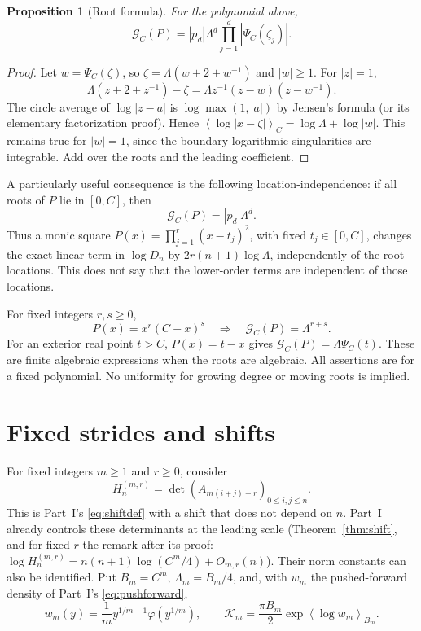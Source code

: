 \documentclass[11pt,a4paper]{article}
\numberwithin{equation}{section}
\newtheorem{proposition}[theorem]{Proposition}
\theoremstyle{remark}\newtheorem{remark}[theorem]{Remark}
\newcommand{\Lam}{\Lambda}
\newcommand{\mean}[1]{\left\langle#1\right\rangle}
\begin{document}
\begin{proposition}[Root formula]\label{szego:prop:rootformula}
For the polynomial above,
\begin{equation}\label{szego:eq:rootformula}
 \mathcal G_C(P)=|p_d|\Lam^d\prod_{j=1}^d|\Psi_C(\zeta_j)|.
\end{equation}
\end{proposition}
\begin{proof}
Let $w=\Psi_C(\zeta)$, so $\zeta=\Lam(w+2+w^{-1})$ and $|w|\geq1$.
For $|z|=1$,
\[
 \Lam(z+2+z^{-1})-\zeta=\Lam z^{-1}(z-w)(z-w^{-1}).
\]
The circle average of $\log|z-a|$ is $\log\max(1,|a|)$ by Jensen's formula
(or its elementary factorization proof). Hence
$\mean{\log|x-\zeta|}_C=\log\Lam+\log|w|$.
This remains true for $|w|=1$, since the boundary logarithmic singularities
are integrable. Add over the roots and the leading coefficient.
\end{proof}

A particularly useful consequence is the following location-independence:
if all roots of $P$ lie in $[0,C]$, then
\begin{equation}\label{szego:eq:invisible}
 \mathcal G_C(P)=|p_d|\Lam^d.
\end{equation}
Thus a monic square $P(x)=\prod_{j=1}^r(x-t_j)^2$, with fixed
$t_j\in[0,C]$, changes the exact linear term in $\log D_n$ by
$2r(n+1)\log\Lam$, independently of the root locations.
This does not say that the lower-order terms are independent of those locations.

For fixed integers $r,s\geq0$,
\begin{equation}\label{szego:eq:endpointP}
 P(x)=x^r(C-x)^s\quad\Longrightarrow\quad
 \mathcal G_C(P)=\Lam^{r+s}.
\end{equation}
For an exterior real point $t>C$,
$P(x)=t-x$ gives $\mathcal G_C(P)=\Lam\Psi_C(t)$.
These are finite algebraic expressions when the roots are algebraic.
All assertions are for a fixed polynomial. No uniformity for growing degree
or moving roots is implied.

\section{Fixed strides and shifts}
\label{szego:sec:strides}
For fixed integers $m\geq1$ and $r\geq0$, consider
\begin{equation}\label{szego:eq:strideD}
 H_n^{(m,r)}=\det(A_{m(i+j)+r})_{0\leq i,j\leq n}.
\end{equation}
This is Part~I's \eqref{eq:shiftdef} with a shift that does not depend on
$n$. Part~I already controls these determinants at the leading scale
(Theorem~\ref{thm:shift}, and for fixed $r$ the remark after its proof:
$\log H_n^{(m,r)}=n(n+1)\log(C^m/4)+O_{m,r}(n)$). Their norm constants can
also be identified.
Put $B_m=C^m$, $\Lam_m=B_m/4$, and, with $w_m$ the pushed-forward density
of Part~I's \eqref{eq:pushforward},
\begin{equation}\label{szego:eq:pushdensity}
 w_m(y)=\frac1m y^{1/m-1}\varphi(y^{1/m}),\qquad
 \mathcal K_m=\frac{\pi B_m}{2}\exp\mean{\log w_m}_{B_m}.
\end{equation}
\end{document}
